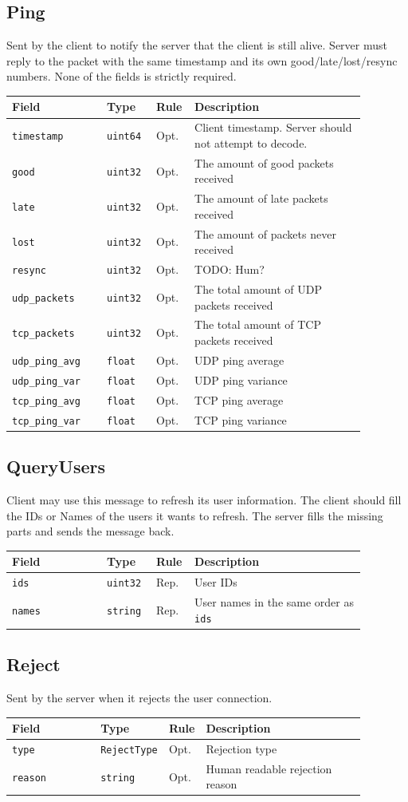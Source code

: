 \documentclass[11pt]{article} %
\newenvironment{mumbleMessageEx}
{%
	\small
	\renewcommand\arraystretch{1.5}
	\begin{tabular}{p{0.25\linewidth}p{0.13\linewidth}p{0.05\linewidth}p{0.45\linewidth}}
	Field & Type & Rule & Description \\
	\hline
}
{%
	\end{tabular}
	\renewcommand\arraystretch{1.0}
}
\newcommand{\mumbleMessageExItem}[4]{ \texttt{#1} & \texttt{#2} & #3 & #4 \\ }
\begin{document}
\subsection{Ping}

Sent by the client to notify the server that the client is still alive. Server must reply to the packet with the same timestamp and its own good/late/lost/resync numbers. None of the fields is strictly required.

\begin{mumbleMessageEx}
\mumbleMessageExItem{timestamp}{uint64}{Opt.}{Client timestamp. Server should not attempt to decode.}
\mumbleMessageExItem{good}{uint32}{Opt.}{The amount of good packets received}
\mumbleMessageExItem{late}{uint32}{Opt.}{The amount of late packets received}
\mumbleMessageExItem{lost}{uint32}{Opt.}{The amount of packets never received}
\mumbleMessageExItem{resync}{uint32}{Opt.}{TODO: Hum?}
\mumbleMessageExItem{udp\_packets}{uint32}{Opt.}{The total amount of UDP packets received}
\mumbleMessageExItem{tcp\_packets}{uint32}{Opt.}{The total amount of TCP packets received}
\mumbleMessageExItem{udp\_ping\_avg}{float}{Opt.}{UDP ping average}
\mumbleMessageExItem{udp\_ping\_var}{float}{Opt.}{UDP ping variance}
\mumbleMessageExItem{tcp\_ping\_avg}{float}{Opt.}{TCP ping average}
\mumbleMessageExItem{tcp\_ping\_var}{float}{Opt.}{TCP ping variance}
\end{mumbleMessageEx}

\subsection{QueryUsers}

Client may use this message to refresh its user information. The client should fill the IDs or Names of the users it wants to refresh. The server fills the missing parts and sends the message back.

\begin{mumbleMessageEx}
\mumbleMessageExItem{ids}{uint32}{Rep.}{User IDs}
\mumbleMessageExItem{names}{string}{Rep.}{User names in the same order as \texttt{ids}}
\end{mumbleMessageEx}

\subsection{Reject}

Sent by the server when it rejects the user connection.

\begin{mumbleMessageEx}
\mumbleMessageExItem{type}{RejectType}{Opt.}{Rejection type}
\mumbleMessageExItem{reason}{string}{Opt.}{Human readable rejection reason}
\end{mumbleMessageEx}
\end{document}
